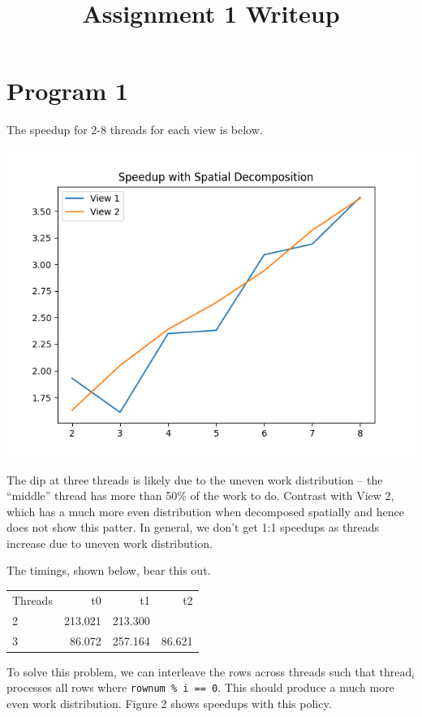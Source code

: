 \documentclass{article}
\title{Assignment 1 Writeup}
\begin{document}
\setlength{\parindent}{0pt}
\setlength{\parskip}{\baselineskip}

\maketitle

\section{Program 1}
The speedup for 2-8 threads for each view is below.

\includegraphics[width=1\textwidth]{speedup_spatial.png}

The dip at three threads is likely due to the uneven work distribution -- the
``middle'' thread has more than 50\% of the work to do. Contrast with View 2,
which has a much more even distribution when decomposed spatially and hence
does not show this patter. In general, we don't get 1:1 speedups as threads
increase due to uneven work distribution.

The timings, shown below, bear this out.

\begin{center}
\begin{tabular}{ l r r r }
  Threads & t0 & t1 & t2 \\
  2 & 213.021 & 213.300 & \\
  3 & 86.072  & 257.164 & 86.621
\end{tabular}
\end{center}

To solve this problem, we can interleave the rows across threads such that
$\mathrm{thread}_{i}$ processes all rows where {\tt rownum \% i == 0}. This
should produce a much more even work distribution. Figure 2 shows speedups with
this policy.
\end{document}
